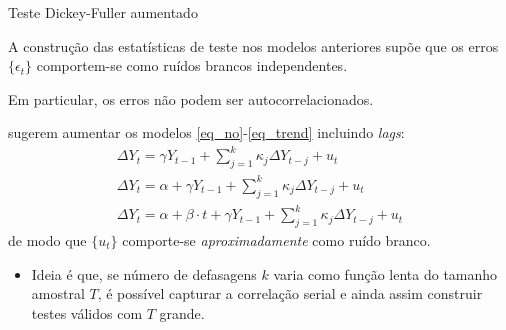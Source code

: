 \documentclass[11pt]{beamer}
\newenvironment{halfwideitemize}{\itemize\addtolength{\itemsep}{0.5em}}{\enditemize}
\begin{document}
\begin{frame}{Teste Dickey-Fuller aumentado}
	\begin{halfwideitemize}
		\item A construção das estatísticas de teste nos modelos anteriores supõe que os erros $\{\epsilon_t\}$ comportem-se como ruídos brancos independentes.
		\begin{halfwideitemize}
			\item Em particular, os erros não podem ser autocorrelacionados. 
		\end{halfwideitemize}
		\item \citet{Said1984} sugerem aumentar os modelos \eqref{eq_no}-\eqref{eq_trend} incluindo \textit{lags}:
		\begin{equation}
			\label{eq_full}
			\begin{aligned}
				\Delta Y_t = \gamma Y_{t-1}  +\sum_{j=1}^k \kappa_j \Delta Y_{t-j} + u_t \\
				\Delta Y_t = \alpha + \gamma Y_{t-1}  +\sum_{j=1}^k \kappa_j \Delta Y_{t-j} + u_t
				\\
				\Delta Y_t = \alpha + \beta \cdot t + \gamma Y_{t-1} +  \sum_{j=1}^k\kappa_j \Delta Y_{t-j} + u_t
			\end{aligned}
		\end{equation}
		de modo que $\{u_t\}$ comporte-se \emph{aproximadamente} como ruído branco.
		\begin{itemize}
			\item Ideia é que, se número de defasagens $k$ varia como função lenta do tamanho amostral $T$, é possível capturar a correlação serial e ainda assim construir testes válidos com $T$ grande. 
		\end{itemize}
		
	\end{halfwideitemize}
\end{frame}
\end{document}
